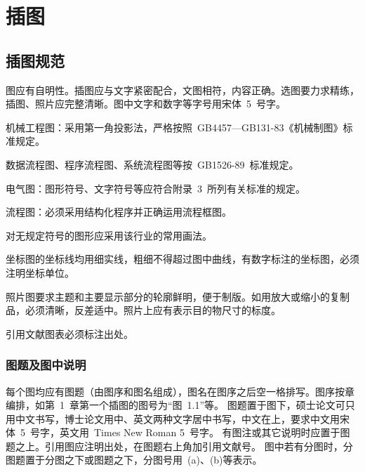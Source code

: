 
%
%
%

\chapter{插图}
\label{chap05}

\section{插图规范}

图应有自明性。插图应与文字紧密配合，文图相符，内容正确。选图要力求精练，插图、照片应完整清晰。图中文字和数字等字号用宋体~5~号字。

机械工程图：采用第一角投影法，严格按照~GB4457---GB131-83《机械制图》标准规定。

数据流程图、程序流程图、系统流程图等按~GB1526-89~标准规定。

电气图：图形符号、文字符号等应符合附录~3~所列有关标准的规定。

流程图：必须采用结构化程序并正确运用流程框图。

对无规定符号的图形应采用该行业的常用画法。

坐标图的坐标线均用细实线，粗细不得超过图中曲线，有数字标注的坐标图，必须注明坐标单位。

照片图要求主题和主要显示部分的轮廓鲜明，便于制版。如用放大或缩小的复制品，必须清晰，反差适中。照片上应有表示目的物尺寸的标度。

引用文献图表必须标注出处。


\subsection{图题及图中说明}

每个图均应有图题（由图序和图名组成），图名在图序之后空一格排写。图序按章编排，如第~1~章第一个插图的图号为“图~1.1”等。
图题置于图下，硕士论文可只用中文书写，博士论文用中、英文两种文字居中书写，中文在上，要求中文用宋体~5~号字，英文用~Times New Roman 5~号字。
有图注或其它说明时应置于图题之上。引用图应注明出处，在图题右上角加引用文献号。
图中若有分图时，分图题置于分图之下或图题之下，分图号用~(a)、(b)等表示。

